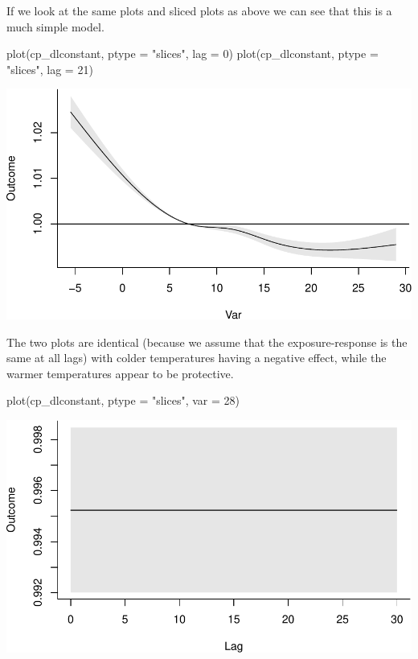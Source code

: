 \documentclass[
]{book}
\newenvironment{Shaded}{\begin{snugshade}}{\end{snugshade}}
\newcommand{\AttributeTok}[1]{\textcolor[rgb]{0.77,0.63,0.00}{#1}}
\newcommand{\DecValTok}[1]{\textcolor[rgb]{0.00,0.00,0.81}{#1}}
\newcommand{\FunctionTok}[1]{\textcolor[rgb]{0.00,0.00,0.00}{#1}}
\newcommand{\NormalTok}[1]{#1}
\newcommand{\StringTok}[1]{\textcolor[rgb]{0.31,0.60,0.02}{#1}}
\begin{document}
If we look at the same plots and sliced plots as above we can see that this is a much simple model.

\begin{Shaded}
\begin{Highlighting}[]
\FunctionTok{plot}\NormalTok{(cp\_dlconstant, }\AttributeTok{ptype =} \StringTok{"slices"}\NormalTok{, }\AttributeTok{lag =} \DecValTok{0}\NormalTok{)}
\FunctionTok{plot}\NormalTok{(cp\_dlconstant, }\AttributeTok{ptype =} \StringTok{"slices"}\NormalTok{, }\AttributeTok{lag =} \DecValTok{21}\NormalTok{)}
\end{Highlighting}
\end{Shaded}

\includegraphics{adv_epi_analysis_files/figure-latex/unnamed-chunk-111-1.pdf}

The two plots are identical (because we assume that the exposure-response is the same at all lags) with colder temperatures having a negative effect, while the warmer temperatures appear to be protective.

\begin{Shaded}
\begin{Highlighting}[]
\FunctionTok{plot}\NormalTok{(cp\_dlconstant, }\AttributeTok{ptype =} \StringTok{"slices"}\NormalTok{, }\AttributeTok{var =} \DecValTok{28}\NormalTok{)}
\end{Highlighting}
\end{Shaded}

\includegraphics{adv_epi_analysis_files/figure-latex/unnamed-chunk-112-1.pdf}
\end{document}
